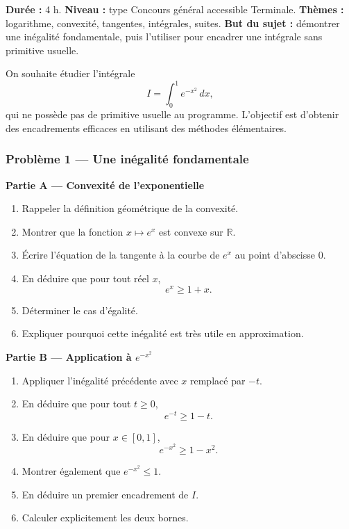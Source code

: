 \documentclass[11pt,a4paper]{article}
\begin{document}
\hypertarget{M-EXCELLENCE-02}{}
\begin{difficile}
\textbf{Durée :} 4 h.  
\textbf{Niveau :} type Concours général accessible Terminale.  
\textbf{Thèmes :} logarithme, convexité, tangentes, intégrales, suites.  
\textbf{But du sujet :} démontrer une inégalité fondamentale, puis l'utiliser pour encadrer une intégrale sans primitive usuelle.

\medskip

On souhaite étudier l'intégrale
\[
I=\int_0^1 e^{-x^2}\,dx,
\]
qui ne possède pas de primitive usuelle au programme. L'objectif est d'obtenir des encadrements efficaces en utilisant des méthodes élémentaires.

\subsubsection*{Problème 1 — Une inégalité fondamentale}

\textbf{Partie A — Convexité de l'exponentielle}
\begin{enumerate}
  \item Rappeler la définition géométrique de la convexité.
  \item Montrer que la fonction $x\mapsto e^x$ est convexe sur $\mathbb R$.
  \item Écrire l'équation de la tangente à la courbe de $e^x$ au point d'abscisse $0$.
  \item En déduire que pour tout réel $x$,
  \[
  e^x\geq 1+x.
  \]
  \item Déterminer le cas d'égalité.
  \item Expliquer pourquoi cette inégalité est très utile en approximation.
\end{enumerate}

\textbf{Partie B — Application à $e^{-x^2}$}
\begin{enumerate}
  \item Appliquer l'inégalité précédente avec $x$ remplacé par $-t$.
  \item En déduire que pour tout $t\geq0$,
  \[
  e^{-t}\geq 1-t.
  \]
  \item En déduire que pour $x\in[0,1]$,
  \[
  e^{-x^2}\geq 1-x^2.
  \]
  \item Montrer également que $e^{-x^2}\leq 1$.
  \item En déduire un premier encadrement de $I$.
  \item Calculer explicitement les deux bornes.
\end{enumerate}


\end{difficile}
\end{document}
